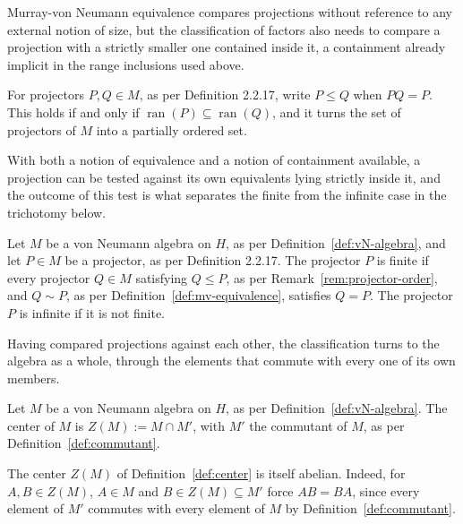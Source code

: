 Murray-von Neumann equivalence compares projections without reference
to any external notion of size, but the classification of factors also
needs to compare a projection with a strictly smaller one contained
inside it, a containment already implicit in the range inclusions used
above.

\begin{remark}\label{rem:projector-order}
	For projectors $P, Q \in M$, as per Definition 2.2.17, write $P \leq
	Q$ when $PQ = P$. This holds if and only if $\operatorname{ran}(P)
	\subseteq \operatorname{ran}(Q)$, and it turns the set of projectors of
	$M$ into a partially ordered set.
\end{remark}

With both a notion of equivalence and a notion of containment
available, a projection can be tested against its own equivalents
lying strictly inside it, and the outcome of this test is what
separates the finite from the infinite case in the trichotomy below.

\begin{definition}\label{def:finite-projection}
	Let $M$ be a von Neumann algebra on $H$, as per
	Definition~\ref{def:vN-algebra}, and let $P \in M$ be a projector, as
	per Definition 2.2.17. The projector $P$ is finite if every projector
	$Q \in M$ satisfying $Q \leq P$, as per Remark~\ref{rem:projector-order},
	and $Q \sim P$, as per Definition~\ref{def:mv-equivalence}, satisfies
	$Q = P$. The projector $P$ is infinite if it is not finite.
\end{definition}

Having compared projections against each other, the classification
turns to the algebra as a whole, through the elements that commute
with every one of its own members.

\begin{definition}[Center]\label{def:center}
	Let $M$ be a von Neumann algebra on $H$, as per
	Definition~\ref{def:vN-algebra}. The center of $M$ is $Z(M) := M \cap
	M'$, with $M'$ the commutant of $M$, as per Definition~\ref{def:commutant}.
\end{definition}

\begin{remark}
	The center $Z(M)$ of Definition~\ref{def:center} is itself abelian.
	Indeed, for $A, B \in Z(M)$, $A \in M$ and $B \in Z(M) \subseteq M'$
	force $AB = BA$, since every element of $M'$ commutes with every
	element of $M$ by Definition~\ref{def:commutant}.
\end{remark}

